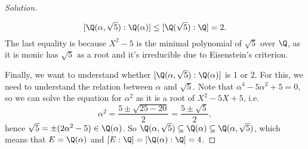 \documentclass[a4paper,10pt,reqno]{amsart}
\newenvironment{sol}
  {\renewcommand\qedsymbol{$\blacksquare$}\begin{proof}[Solution]}
  {\end{proof}}
\begin{document}
\begin{sol}
\begin{multicols}{2}
 \[
 [\Q(\alpha,\sqrt{5}):\Q(\alpha)]\leq [\Q(\sqrt{5}):\Q]=2.
 \]
 The last equality is because $X^2-5$ is 
 the minimal polynomial of $\sqrt{5}$ over $\Q$,
 as it is monic has $\sqrt{5}$ as a root 
 and it's irreducible due to Eisenstein's criterion.
 \end{multicols}
 Finally, we want to understand whether $[\Q(\alpha,\sqrt{5}):\Q(\alpha)]$ is 1 or 2.
 For this, we need to understand the relation between $\alpha$ and $\sqrt{5}$.
Note that $\alpha^4-5\alpha^2+5=0$, so we can solve the equation for
$\alpha^2$ as it is a root of $X^2-5X+5$, i.e.
 \[
\alpha^2=\frac{5\pm \sqrt{25-20}}{2}=\frac{5\pm \sqrt{5}}{2},
 \]
 hence $\sqrt{5}=\pm (2\alpha^2-5)\in\Q(\alpha)$.
 So $\Q(\alpha,\sqrt{5})\subseteq\Q(\alpha)\subseteq \Q(\alpha,\sqrt{5})$, 
which means that $E=\Q(\alpha)$ and
$[E:\Q]=[\Q(\alpha):\Q]=4$.
\end{sol}
\end{document}
